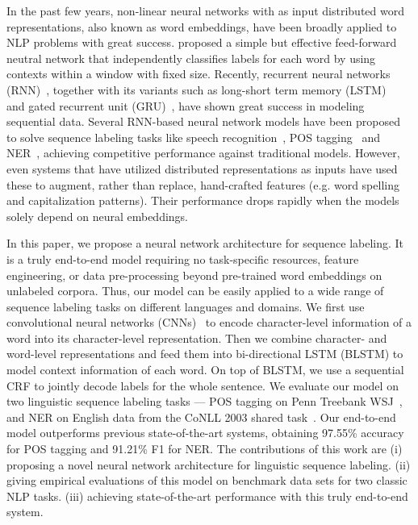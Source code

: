 \documentclass[11pt]{article}
\begin{document}
In the past few years, non-linear neural networks with as input distributed word representations, also known as word embeddings, have been broadly applied to NLP problems with great success.  proposed a simple but effective feed-forward neutral network that independently classifies labels for each word by using contexts within a window with fixed size. Recently, recurrent neural networks (RNN)~\cite{goller1996learning}, together with its variants such as long-short term memory (LSTM)~\cite{hochreiter1997long,gers2000learning} and gated recurrent unit (GRU)~\cite{cho2014properties}, have shown great success in modeling sequential data.
Several RNN-based neural network models have been proposed to solve sequence labeling tasks like speech recognition~\cite{graves2013speech}, POS tagging~\cite{huang2015bidirectional} and NER~\cite{chiu2015named,Hu:2016:ACL}, achieving competitive performance against traditional models. However, even systems that have utilized distributed representations as inputs have used these to augment, rather than replace, hand-crafted features (e.g. word spelling and capitalization patterns). Their performance drops rapidly when the models solely depend on neural embeddings.

In this paper, we propose a neural network architecture for sequence labeling. It is a truly end-to-end model requiring no task-specific resources, feature engineering, or data pre-processing beyond pre-trained word embeddings on unlabeled corpora. Thus, our model can be easily applied to a wide range of sequence labeling tasks on different languages and domains. We first use convolutional neural networks (CNNs)~\cite{lecun1989backpropagation} to encode character-level information of a word into its character-level representation. Then we combine character- and word-level representations and feed them into bi-directional LSTM (BLSTM) to model context information of each word. On top of BLSTM, we use a sequential CRF to jointly decode labels for the whole sentence. We evaluate our model on two linguistic sequence labeling tasks --- POS tagging on Penn Treebank WSJ~\cite{Marcus:1993}, and NER on English data from the CoNLL 2003 shared task~\cite{TjongKimSang:2003}. Our end-to-end model outperforms previous state-of-the-art systems, obtaining 97.55\% accuracy for POS tagging and 91.21\% F1 for NER. The contributions of this work are (i) proposing a novel neural network architecture for linguistic sequence labeling. (ii) giving empirical evaluations of this model on benchmark data sets for two classic NLP tasks. (iii) achieving state-of-the-art performance with this truly end-to-end system.
\end{document}
